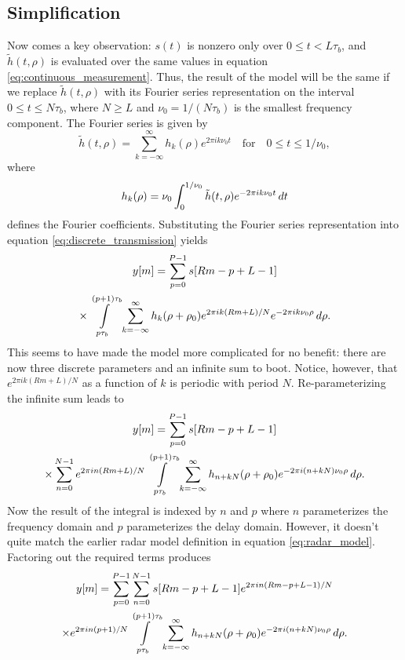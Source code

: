 \subsection{Simplification}
Now comes a key observation: $s(t)$ is nonzero only over $0 \leq t < L\tau_b$, and $\tilde{h}(t, \rho)$ is evaluated over the same values in equation \eqref{eq:continuous_measurement}. Thus, the result of the model will be the same if we replace $\tilde{h}(t, \rho)$ with its Fourier series representation on the interval $0 \leq t \leq N\tau_b$, where $N \geq L$ and $\nu_0 = 1/(N\tau_b)$ is the smallest frequency component. The Fourier series is given by
\begin{equation}
 \tilde{h}(t, \rho) = \sum_{k = -\infty}^{\infty} h_k(\rho) e^{2\pi i k \nu_0 t} \quad \text{for} \quad 0 \leq t \leq 1/\nu_0,
\end{equation}
where
\begin{equation}\label{eq:fourier_series_coefficients}
 h_k(\rho) = \nu_0 \int_{0}^{1/\nu_0} \tilde{h}(t, \rho) e^{-2\pi i k\nu_0 t} \,d t
\end{equation}
defines the Fourier coefficients. Substituting the Fourier series representation into equation \eqref{eq:discrete_transmission} yields
\begin{multline}
 y[m] = \sum_{p=0}^{P-1} s[Rm-p+L-1]\\
 \times \int\limits_{p\tau_b}^{(p+1)\tau_b} \sum_{k = -\infty}^{\infty} h_k(\rho + \rho_0) e^{2\pi i k(Rm + L)/N} e^{-2\pi i k\nu_0 \rho} \,d\rho.
\end{multline}
This seems to have made the model more complicated for no benefit: there are now three discrete parameters and an infinite sum to boot. Notice, however, that $e^{2 \pi i k(Rm+L)/N}$ as a function of $k$ is periodic with period $N$. Re-parameterizing the infinite sum leads to
\begin{multline}
 y[m] = \sum_{p=0}^{P-1} s[Rm-p+L-1] \\
 \times \sum_{n=0}^{N-1} e^{2 \pi i n(Rm+L)/N} \int\limits_{p\tau_b}^{(p+1)\tau_b} \sum_{k = -\infty}^{\infty} h_{n + kN}(\rho + \rho_0) e^{-2\pi i (n + kN) \nu_0 \rho} \,d\rho.
\end{multline}
Now the result of the integral is indexed by $n$ and $p$ where $n$ parameterizes the frequency domain and $p$ parameterizes the delay domain. However, it doesn't quite match the earlier radar model definition in equation \eqref{eq:radar_model}. Factoring out the required terms produces
\begin{multline}
 y[m] = \sum_{p=0}^{P-1} \sum_{n=0}^{N-1} s[Rm-p+L-1] e^{2 \pi i n(Rm-p+L-1)/N}\\
 \times e^{2 \pi i n(p+1)/N} \int\limits_{p\tau_b}^{(p+1)\tau_b} \sum_{k = -\infty}^{\infty} h_{n + kN}(\rho + \rho_0) e^{-2\pi i (n + kN) \nu_0 \rho} \,d\rho.
\end{multline}
